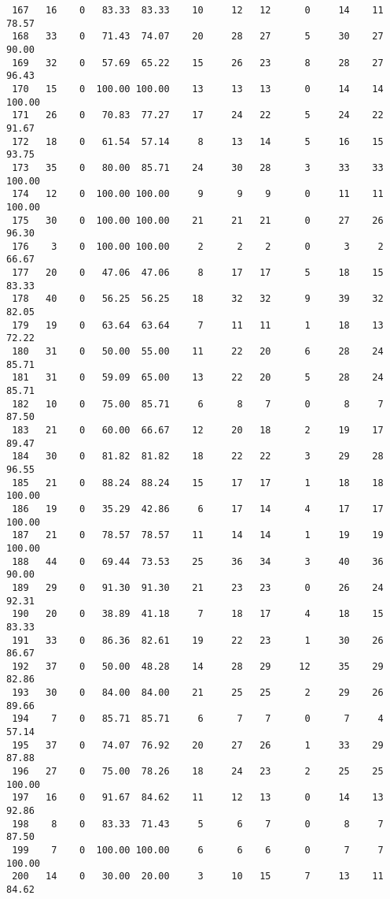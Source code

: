 \begin{verbatim}
 167   16    0   83.33  83.33    10     12   12      0     14    11    78.57
 168   33    0   71.43  74.07    20     28   27      5     30    27    90.00
 169   32    0   57.69  65.22    15     26   23      8     28    27    96.43
 170   15    0  100.00 100.00    13     13   13      0     14    14   100.00
 171   26    0   70.83  77.27    17     24   22      5     24    22    91.67
 172   18    0   61.54  57.14     8     13   14      5     16    15    93.75
 173   35    0   80.00  85.71    24     30   28      3     33    33   100.00
 174   12    0  100.00 100.00     9      9    9      0     11    11   100.00
 175   30    0  100.00 100.00    21     21   21      0     27    26    96.30
 176    3    0  100.00 100.00     2      2    2      0      3     2    66.67
 177   20    0   47.06  47.06     8     17   17      5     18    15    83.33
 178   40    0   56.25  56.25    18     32   32      9     39    32    82.05
 179   19    0   63.64  63.64     7     11   11      1     18    13    72.22
 180   31    0   50.00  55.00    11     22   20      6     28    24    85.71
 181   31    0   59.09  65.00    13     22   20      5     28    24    85.71
 182   10    0   75.00  85.71     6      8    7      0      8     7    87.50
 183   21    0   60.00  66.67    12     20   18      2     19    17    89.47
 184   30    0   81.82  81.82    18     22   22      3     29    28    96.55
 185   21    0   88.24  88.24    15     17   17      1     18    18   100.00
 186   19    0   35.29  42.86     6     17   14      4     17    17   100.00
 187   21    0   78.57  78.57    11     14   14      1     19    19   100.00
 188   44    0   69.44  73.53    25     36   34      3     40    36    90.00
 189   29    0   91.30  91.30    21     23   23      0     26    24    92.31
 190   20    0   38.89  41.18     7     18   17      4     18    15    83.33
 191   33    0   86.36  82.61    19     22   23      1     30    26    86.67
 192   37    0   50.00  48.28    14     28   29     12     35    29    82.86
 193   30    0   84.00  84.00    21     25   25      2     29    26    89.66
 194    7    0   85.71  85.71     6      7    7      0      7     4    57.14
 195   37    0   74.07  76.92    20     27   26      1     33    29    87.88
 196   27    0   75.00  78.26    18     24   23      2     25    25   100.00
 197   16    0   91.67  84.62    11     12   13      0     14    13    92.86
 198    8    0   83.33  71.43     5      6    7      0      8     7    87.50
 199    7    0  100.00 100.00     6      6    6      0      7     7   100.00
 200   14    0   30.00  20.00     3     10   15      7     13    11    84.62

\end{verbatim}
